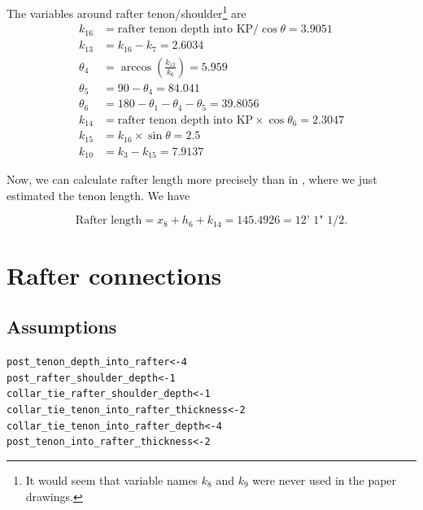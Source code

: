 \documentclass{article}\usepackage[]{graphicx}\usepackage[]{xcolor}
\makeatletter
\newcommand{\hlnum}[1]{\textcolor[rgb]{0.686,0.059,0.569}{#1}}%
\newcommand{\hlstd}[1]{\textcolor[rgb]{0.345,0.345,0.345}{#1}}%
\newcommand{\hlkwb}[1]{\textcolor[rgb]{0.69,0.353,0.396}{#1}}%
\newenvironment{kframe}{%
 \def\at@end@of@kframe{}%
 \ifinner\ifhmode%
  \def\at@end@of@kframe{\end{minipage}}%
  \begin{minipage}{\columnwidth}%
 \fi\fi%
 \def\FrameCommand##1{\hskip\@totalleftmargin \hskip-\fboxsep
 \colorbox{shadecolor}{##1}\hskip-\fboxsep
     \hskip-\linewidth \hskip-\@totalleftmargin \hskip\columnwidth}%
 \MakeFramed {\advance\hsize-\width
   \@totalleftmargin\z@ \linewidth\hsize
   \@setminipage}}%
 {\par\unskip\endMakeFramed%
 \at@end@of@kframe}
\newenvironment{knitrout}{}{} %
\makeatother
\begin{document}
The variables around rafter tenon/shoulder\footnote{It would seem that variable names $k_8$ and $k_9$ were never used in the paper drawings.} are 
\begin{align*}
k_{16} &= \text{rafter tenon depth into KP}/\cos\theta = 3.9051\\
k_{13} &= k_{16} - k_7 = 2.6034\\
\theta_4 &= \arccos \left(\frac{k_{12}}{k_6}\right) = 5.959\\
\theta_5 &= 90 - \theta_4 = 84.041\\
\theta_6 &= 180 - \theta_1 - \theta_4 - \theta_5 = 39.8056\\
k_{14} &= \text{rafter tenon depth into KP} \times \cos\theta_6 = 2.3047\\
k_{15} &= k_{16} \times \sin\theta = 2.5\\
k_{10} &= k_3 - k_{15} = 7.9137
\end{align*}



Now, we can calculate rafter length more precisely than in , where we just estimated the tenon length. We have 

\[ \boxed{\text{Rafter length} = x_8 + h_6 + k_{14} = 145.4926 = \text{12' 1" 1/2}.}\]

 








 




\section{Rafter connections} \label{rafter-lengths-and-connections}

\subsection{Assumptions} \label{rafter-lengths-connections-assumptions}
\begin{knitrout}
\color{fgcolor}\begin{kframe}
\begin{alltt}
\hlstd{post_tenon_depth_into_rafter} \hlkwb{<-} \hlnum{4}
\hlstd{post_rafter_shoulder_depth} \hlkwb{<-} \hlnum{1}
\hlstd{collar_tie_rafter_shoulder_depth} \hlkwb{<-} \hlnum{1}
\hlstd{collar_tie_tenon_into_rafter_thickness} \hlkwb{<-} \hlnum{2}
\hlstd{collar_tie_tenon_into_rafter_depth} \hlkwb{<-} \hlnum{4}
\hlstd{post_tenon_into_rafter_thickness} \hlkwb{<-} \hlnum{2}
\end{alltt}
\end{kframe}
\end{knitrout}
\end{document}
